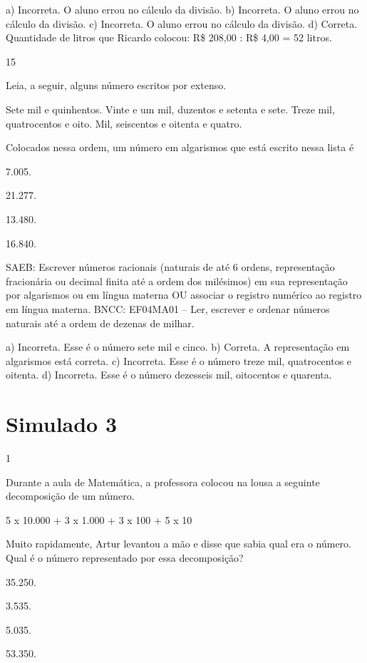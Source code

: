 \begin{mdframed}[linewidth=2pt,linecolor=salmao,roundcorner=2pt]
\begin{escolha}
{\begin{escolha}
a) Incorreta. O aluno errou no cálculo da divisão.
b) Incorreta. O aluno errou no cálculo da divisão.
c) Incorreta. O aluno errou no cálculo da divisão.
d) Correta. Quantidade de litros que Ricardo colocou: R\$ 208,00 : R\$ 4,00 = 52
litros.

\num{15}

Leia, a seguir, alguns número escritos por extenso.

Sete mil e quinhentos.
Vinte e um mil, duzentos e setenta e sete.
Treze mil, quatrocentos e oito.
Mil, seiscentos e oitenta e quatro.

Colocados nessa ordem, um número em algarismos que está escrito nessa lista é

\begin{escolha}
\item 7.005.
\item 21.277.
\item 13.480.
\item 16.840.
\end{escolha}

SAEB: Escrever números racionais (naturais de até 6 ordens, representação
fracionária ou decimal finita até a ordem dos milésimos) em sua
representação por algarismos ou em língua materna OU associar o registro
numérico ao registro em língua materna.
BNCC: EF04MA01 -- Ler, escrever e ordenar números naturais até a ordem de dezenas de milhar.

a) Incorreta. Esse é o número sete mil e cinco.
b) Correta. A representação em algarismos está correta.
c) Incorreta. Esse é o número treze mil, quatrocentos e oitenta.
d) Incorreta. Esse é o número dezesseis mil, oitocentos e quarenta.

\chapter{Simulado 3}

\num{1}

Durante a aula de Matemática, a professora colocou na lousa a seguinte
decomposição de um número.

5 x 10.000 + 3 x 1.000 + 3 x 100 + 5 x 10

Muito rapidamente, Artur levantou a mão e disse que sabia qual era o
número. Qual é o número representado por essa decomposição?

\begin{escolha}
\item
  35.250.
\item
  3.535.
\item
  5.035.
\item
  53.350.
\end{escolha}


\end{escolha}}
\end{escolha}
\end{mdframed}
